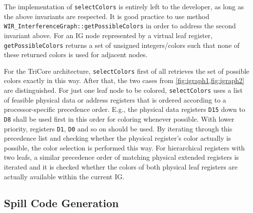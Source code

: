 The implementation of \texttt{selectColors} is entirely left to the developer, as long as the above invariants are respected.
It is good practice to use method \texttt{WIR\_InterferenceGraph::getPossibleColors} in order to address the second invariant above.
For an \gls{IG} node represented by a virtual leaf register, \texttt{getPossibleColors} returns a set of unsigned integers/colors such that none of these returned colors is used for adjacent nodes.

For the TriCore architecture, \texttt{selectColors} first of all retrieves the set of possible colors exactly in this way.
After that, the two cases from \cref{fig:igraph1,fig:igraph2} are distinguished.
For just one leaf node to be colored, \texttt{selectColors} uses a list of feasible physical data or address registers that is ordered according to a processor-specific precedence order.
E.g., the physical data registers \texttt{D15} down to \texttt{D8} shall be used first in this order for coloring whenever possible.
With lower priority, registers \texttt{D1}, \texttt{D0} and so on should be used.
By iterating through this precedence list and checking whether the physical register's color actually is possible, the color selection is performed this way.
For hierarchical registers with two leafs, a similar precedence order of matching physical extended registers is iterated and it is checked whether the colors of both physical leaf registers are actually available within the current \gls{IG}.


\subsection{Spill Code Generation}
\label{ssec:spillcode}

